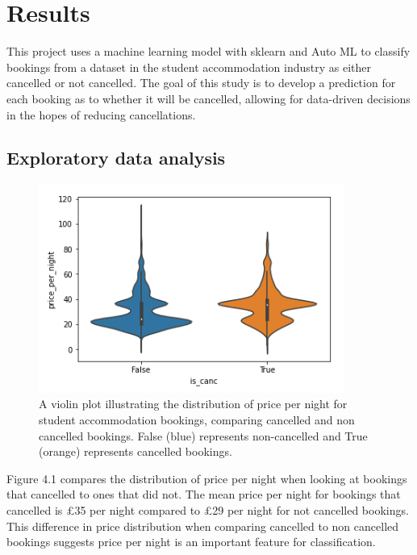 \chapter{Results}
\label{ch:results}

This project uses a machine learning model with sklearn and Auto ML to classify bookings from a dataset in the student accommodation industry as either cancelled or not cancelled. The goal of this study is to develop a prediction for each booking as to whether it will be cancelled, allowing for data-driven decisions in the hopes of reducing cancellations.
\section{Exploratory data analysis}

 \begin{figure}[H]
 \centering
 \includegraphics[width=10cm]{figures/price_per_night.png}
 \caption{A violin plot illustrating the distribution of price per night for student accommodation bookings, comparing cancelled and non cancelled bookings. False (blue) represents non-cancelled and True (orange)  represents cancelled bookings.}
\end{figure}
  
 Figure 4.1 compares the distribution of price per night when looking at bookings that cancelled to ones that did not. The mean price per night for bookings that cancelled is £35 per night compared to £29 per night for not cancelled bookings. This difference in price distribution when comparing cancelled to non cancelled bookings suggests price per night is an important feature for classification. 

